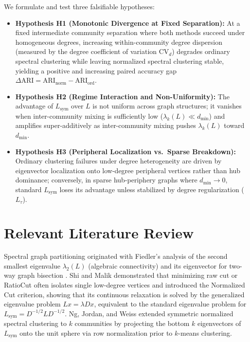 \documentclass[10pt,twocolumn,a4paper]{article}
\begin{document}
We formulate and test three falsifiable hypotheses:
\begin{itemize}\setlength{\itemsep}{1pt}\setlength{\parskip}{0pt}
    \item \textbf{Hypothesis H1 (Monotonic Divergence at Fixed Separation):} At a fixed intermediate community separation where both methods succeed under homogeneous degrees, increasing within-community degree dispersion (measured by the degree coefficient of variation $\mathrm{CV}_d$) degrades ordinary spectral clustering while leaving normalized spectral clustering stable, yielding a positive and increasing paired accuracy gap $\Delta\mathrm{ARI} = \mathrm{ARI}_{\mathrm{norm}} - \mathrm{ARI}_{\mathrm{ord}}$.
    \item \textbf{Hypothesis H2 (Regime Interaction and Non-Uniformity):} The advantage of $L_{\mathrm{sym}}$ over $L$ is not uniform across graph structures; it vanishes when inter-community mixing is sufficiently low ($\lambda_k(L) \ll d_{\min}$) and amplifies super-additively as inter-community mixing pushes $\lambda_k(L)$ toward $d_{\min}$.
    \item \textbf{Hypothesis H3 (Peripheral Localization vs.\ Sparse Breakdown):} Ordinary clustering failures under degree heterogeneity are driven by eigenvector localization onto low-degree peripheral vertices rather than hub dominance; conversely, in sparse hub-periphery graphs where $d_{\min} \to 0$, standard $L_{\mathrm{sym}}$ loses its advantage unless stabilized by degree regularization ($L_\tau$).
\end{itemize}

\section{Relevant Literature Review}
Spectral graph partitioning originated with Fiedler's analysis of the second smallest eigenvalue $\lambda_2(L)$ (algebraic connectivity) and its eigenvector for two-way graph bisection \cite{fiedler1973algebraic}. Shi and Malik \cite{shi2000normalized} demonstrated that minimizing raw cut or RatioCut often isolates single low-degree vertices and introduced the Normalized Cut criterion, showing that its continuous relaxation is solved by the generalized eigenvalue problem $L x = \lambda D x$, equivalent to the standard eigenvalue problem for $L_{\mathrm{sym}} = D^{-1/2} L D^{-1/2}$. Ng, Jordan, and Weiss \cite{ng2001spectral} extended symmetric normalized spectral clustering to $k$ communities by projecting the bottom $k$ eigenvectors of $L_{\mathrm{sym}}$ onto the unit sphere via row normalization prior to $k$-means clustering.
\end{document}
